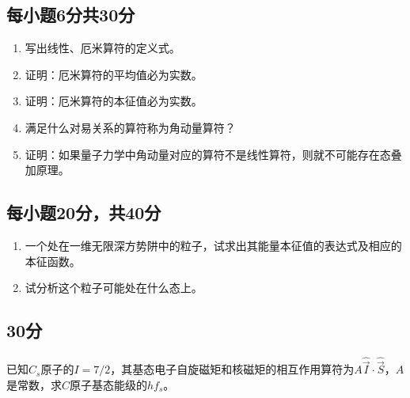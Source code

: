 

\subsection{每小题6分共30分}

\begin{enumerate}
        \item 写出线性、厄米算符的定义式。
        \item 证明：厄米算符的平均值必为实数。
        \item 证明：厄米算符的本征值必为实数。
        \item 满足什么对易关系的算符称为角动量算符？
        \item 证明：如果量子力学中角动量对应的算符不是线性算符，则就不可能存在态叠加原理。
    \end{enumerate}
 \subsection{每小题20分，共40分} 
    \begin{enumerate}
        \item 一个处在一维无限深方势阱中的粒子，试求出其能量本征值的表达式及相应的本征函数。
        \item 试分析这个粒子可能处在什么态上。
    \end{enumerate}
  \subsection{30分}
    已知$C_s$原子的$I=7/2$，其基态电子自旋磁矩和核磁矩的相互作用算符为$A\hat{\vec I}\cdot\hat{\vec S}$，$A$是常数，求$C$原子基态能级的$hf_s$。
  